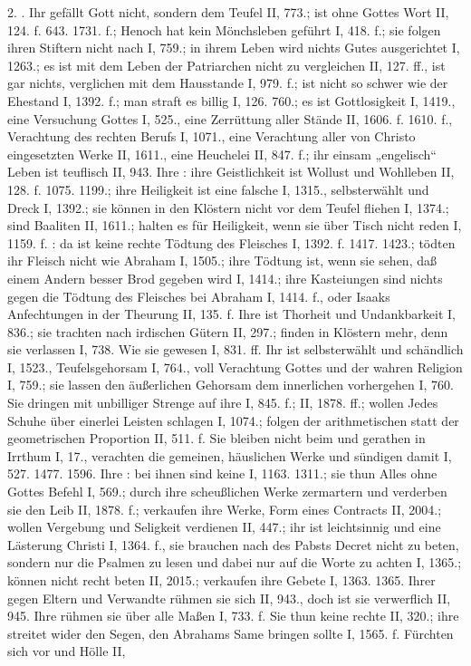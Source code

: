 2. . Ihr  gefällt Gott nicht, sondern dem Teufel II, 773.; ist ohne Gottes Wort II, 124. f. 643. 1731. f.; Henoch hat kein Mönchsleben geführt I, 418. f.; sie folgen ihren Stiftern nicht nach I, 759.; in ihrem Leben wird nichts Gutes ausgerichtet I, 1263.; es ist mit dem Leben der Patriarchen nicht zu vergleichen II, 127. ff., ist gar nichts, verglichen mit dem Hausstande I, 979. f.; ist nicht so schwer wie der Ehestand I, 1392. f.; man straft es billig I, 126. 760.; es ist Gottlosigkeit I, 1419., eine Versuchung Gottes I, 525., eine Zerrüttung aller Stände II, 1606. f. 1610. f., Verachtung des rechten Berufs I, 1071., eine Verachtung aller von Christo eingesetzten Werke II, 1611., eine Heuchelei II, 847. f.; ihr einsam „engelisch“ Leben ist teuflisch II, 943. Ihre : ihre Geistlichkeit ist Wollust und Wohlleben II, 128. f. 1075. 1199.; ihre Heiligkeit ist eine falsche I, 1315., selbsterwählt und Dreck I, 1392.; sie können in den Klöstern nicht vor dem Teufel fliehen I, 1374.; sind Baaliten II, 1611.; halten es für Heiligkeit, wenn sie über Tisch nicht reden I, 1159. f. : da ist keine rechte Tödtung des Fleisches I, 1392. f. 1417. 1423.; tödten ihr Fleisch nicht wie Abraham I, 1505.; ihre Tödtung ist, wenn sie sehen, daß einem Andern besser Brod gegeben wird I, 1414.; ihre Kasteiungen sind nichts gegen die Tödtung des Fleisches bei Abraham I, 1414. f., oder Isaaks Anfechtungen in der Theurung II, 135. f. Ihre  ist Thorheit und Undankbarkeit I, 836.; sie trachten nach irdischen Gütern II, 297.; finden in Klöstern mehr, denn sie verlassen I, 738. Wie  sie gewesen I, 831. ff. Ihr  ist selbsterwählt und schändlich I, 1523., Teufelsgehorsam I, 764., voll Verachtung Gottes und der wahren Religion I, 759.; sie lassen den äußerlichen Gehorsam dem innerlichen vorhergehen I, 760. Sie dringen mit unbilliger Strenge auf ihre  I, 845. f.; II, 1878. ff.; wollen Jedes Schuhe über einerlei Leisten schlagen I, 1074.; folgen der arithmetischen statt der geometrischen Proportion II, 511. f. Sie bleiben nicht beim  und gerathen in Irrthum I, 17., verachten die gemeinen, häuslichen Werke und sündigen damit I, 527. 1477. 1596. Ihre : bei ihnen sind keine  I, 1163. 1311.; sie thun Alles ohne Gottes Befehl I, 569.; durch ihre scheußlichen Werke zermartern und verderben sie den Leib II, 1878. f.; verkaufen ihre Werke, Form eines Contracts II, 2004.; wollen Vergebung und Seligkeit verdienen II, 447.; ihr  ist leichtsinnig und eine Lästerung Christi I, 1364. f., sie brauchen nach des Pabsts Decret nicht zu beten, sondern nur die Psalmen zu lesen und dabei nur auf die Worte zu achten I, 1365.; können nicht recht beten II, 2015.; verkaufen ihre Gebete I, 1363. 1365. Ihrer  gegen Eltern und Verwandte rühmen sie sich II, 943., doch ist sie verwerflich II, 945. Ihre  rühmen sie über alle Maßen I, 733. f. Sie thun keine rechte  II, 320.; ihre  streitet wider den Segen, den Abrahams Same bringen sollte I, 1565. f. Fürchten sich vor  und Hölle II, 